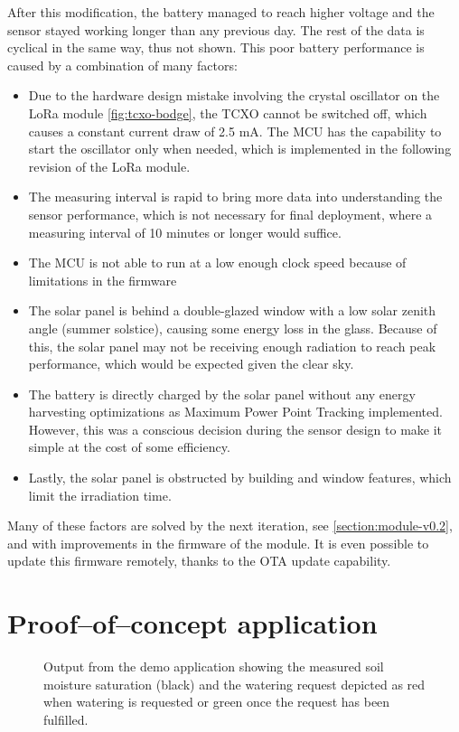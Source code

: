 After this modification, the battery managed to reach higher voltage and the sensor stayed working longer than any previous day. The rest of the data is cyclical in the same way, thus not shown. This poor battery performance is caused by a combination of many factors:
\newpage
\begin{itemize}
    \item Due to the hardware design mistake involving the crystal oscillator on the LoRa module \ref{fig:tcxo-bodge}, the TCXO cannot be switched off, which causes a constant current draw of 2.5 mA. The MCU has the capability to start the oscillator only when needed, which is implemented in the following revision of the LoRa module.
    \item The measuring interval is rapid to bring more data into understanding the sensor performance, which is not necessary for final deployment, where a measuring interval of 10 minutes or longer would suffice.
    \item The MCU is not able to run at a low enough clock speed because of limitations in the firmware
    \item The solar panel is behind a double-glazed window with a low solar zenith angle (summer solstice), causing some energy loss in the glass. Because of this, the solar panel may not be receiving enough radiation to reach peak performance, which would be expected given the clear sky.
    \item The battery is directly charged by the solar panel without any energy harvesting optimizations as Maximum Power Point Tracking implemented. However, this was a conscious decision during the sensor design to make it simple at the cost of some efficiency.
    \item Lastly, the solar panel is obstructed by building and window features, which limit the irradiation time.
\end{itemize}

Many of these factors are solved by the next iteration, see \ref{section:module-v0.2}, and with improvements in the firmware of the module. It is even possible to update this firmware remotely, thanks to the OTA update capability.

\newpage
\section{Proof--of--concept application}
\begin{figure}[H]
    
    \caption{\label{fig:watering}Output from the demo application showing the measured soil moisture saturation (black) and the watering request depicted as red when watering is requested or green once the request has been fulfilled.}
\end{figure}


